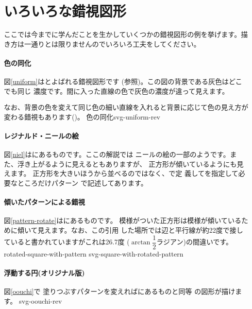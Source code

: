 \section{いろいろな錯視図形}
ここでは今までに学んだことを生かしていくつかの錯視図形の例を挙げます。描
き方は一通りとは限りませんのでいろいろ工夫をしてください。
\paragraph{色の同化}
 図\ref{uniform}はとよばれる錯視図形です
 (\cite[62ページ図6.8]{Ninio}参照)。この図の背景である灰色はどこでも同じ
 濃度です。間に入った直線の色で灰色の濃度が違って見えます。

なお、背景の色を変えて同じ色の細い直線を入れると背景に応じて色の見え方が
変わる錯視もあります(\cite[90ページ]{OIHandbook})。
     {色の同化}{svg-uniform-rev}
\paragraph{レジナルド・ニールの絵}
図\ref{niel}は\cite[75ページ図7.6]{Ninio}にあるものです。ここの解説では
ニールの絵の一部のようです。また、浮き上がるように見えるともありますが、
正方形が傾いているようにも見えます。
{正方形を大きいほうから並べるのではなく、\noexpand{}で定
義して\noexpand{}を指定して必要なところだけパターン
で記述してあります。}
\paragraph{傾いたパターンによる錯視}
図\ref{pattern-rotate}は\cite[188ページ図17.9]{Ninio}にあるものです。
模様がついた正方形は模様が傾いているために傾いて見えます。なお、この引用
した場所では辺と平行線が約22度で接していると書かれていますがこれは26.7度
($\arctan\dfrac{1}{2}$ラジアン)の間違いです。
{}{rotated-square-with-pattern}
{svg-square-with-rotated-pattern}
\paragraph{浮動する円(オリジナル版)}
図\ref{oouchi}で
塗りつぶすパターンを変えれば\cite[74ページ図7.5]{Ninio}にあるものと同等
の図形が描けます。
{svg-oouchi-rev}
